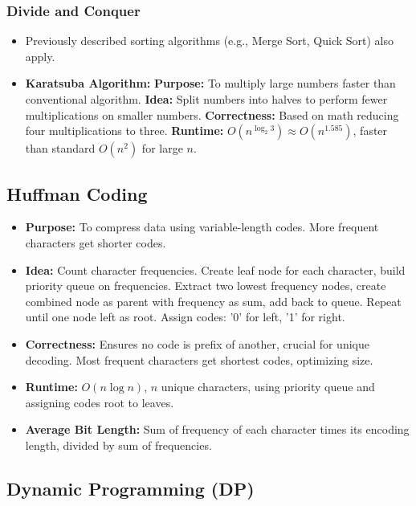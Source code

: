 \documentclass[landscape,7pt]{extarticle}
\begin{document}
\begin{multicols*}{3}
\subsubsection*{Divide and Conquer}
\begin{itemize}
\item Previously described sorting algorithms (e.g., Merge Sort, Quick Sort) also apply.
\item \textbf{Karatsuba Algorithm:} \textbf{Purpose:} To multiply large numbers faster than conventional algorithm. \textbf{Idea:} Split numbers into halves to perform fewer multiplications on smaller numbers. \textbf{Correctness:} Based on math reducing four multiplications to three. \textbf{Runtime:} $O(n^{\log_2 3}) \approx O(n^{1.585})$, faster than standard $O(n^2)$ for large $n$.
\end{itemize}

\subsection*{Huffman Coding}
\begin{itemize}
\item \textbf{Purpose:} To compress data using variable-length codes. More frequent characters get shorter codes.
\item \textbf{Idea:} Count character frequencies. Create leaf node for each character, build priority queue on frequencies. Extract two lowest frequency nodes, create combined node as parent with frequency as sum, add back to queue. Repeat until one node left as root. Assign codes: '0' for left, '1' for right.
\item \textbf{Correctness:} Ensures no code is prefix of another, crucial for unique decoding. Most frequent characters get shortest codes, optimizing size.
\item \textbf{Runtime:} $O(n \log n)$, $n$ unique characters, using priority queue and assigning codes root to leaves.
\item \textbf{Average Bit Length:} Sum of frequency of each character times its encoding length, divided by sum of frequencies.
\end{itemize}

\subsection*{Dynamic Programming (DP)}


\end{multicols*}
\end{document}

